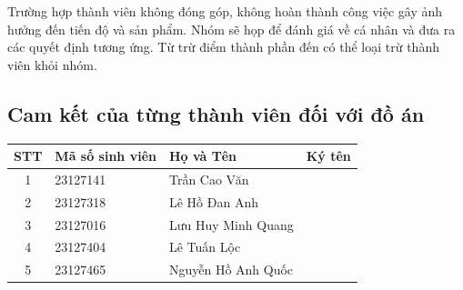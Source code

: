 \documentclass[12pt,a4paper]{article}
\begin{document}
Trường hợp thành viên không đóng góp, không hoàn thành công việc gây ảnh hưởng đến tiến độ và sản phẩm. Nhóm sẽ họp để đánh giá về cá nhân và đưa ra các quyết định tương ứng. Từ trừ điểm thành phần đến có thể loại trừ thành viên khỏi nhóm.

\subsection{Cam kết của từng thành viên đối với đồ án}

\vspace{0.25cm}
\def\arraystretch{2.5} %
\setlength{\tabcolsep}{12pt} %

\begin{tabular}{c l l p{4cm}} %
\toprule
\textbf{STT} & \textbf{Mã số sinh viên} & \textbf{Họ và Tên} & \textbf{Ký tên}\\
\midrule
1 & 23127141 & Trần Cao Văn & \\
2 & 23127318 & Lê Hồ Đan Anh & \\
3 & 23127016 & Lưu Huy Minh Quang & \\
4 & 23127404 & Lê Tuấn Lộc & \\
5 & 23127465 & Nguyễn Hồ Anh Quốc & \\
\bottomrule
\end{tabular}
\vspace{0.5cm}
\end{document}
